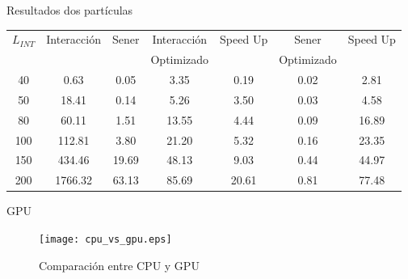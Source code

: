 \documentclass{beamer}
\begin{document}
\begin{frame}{Resultados dos part\'iculas}{}
  \begin{table}[H]
  \begin{center}

  \begin{adjustbox}{max width=\textwidth}
  \begin{tabular}{ |c|c|c|c|c|c|c| }
    \hline
    $L_{INT}$ & Interacci\'on  & Sener    & Interacci\'on & Speed Up & Sener      & Speed Up \\
              &                &          & Optimizado    &          & Optimizado & \\
    \hline
    40  & 0.63    & 0.05    & 3.35    & 0.19  & 0.02  & 2.81 \\
    50  & 18.41   & 0.14    & 5.26    & 3.50  & 0.03  & 4.58 \\
    80  & 60.11   & 1.51    & 13.55   & 4.44  & 0.09  & 16.89 \\
    100 & 112.81  & 3.80    & 21.20   & 5.32  & 0.16  & 23.35 \\
    150 & 434.46  & 19.69   & 48.13   & 9.03  & 0.44  & 44.97 \\
    200 & 1766.32 & 63.13   & 85.69   & 20.61 & 0.81  & 77.48 \\
    \hline
  \end{tabular}
  \end{adjustbox}

  \end{center}
  \end{table}
\end{frame}

\begin{frame}{GPU}{}
  \begin{figure}[h]
    \renewcommand\figurename{Gr\'agico}
    \begin{center}
      \leavevmode
   
      \texttt{[image: cpu\_vs\_gpu.eps]}

      \caption{Comparaci\'on entre CPU y GPU}

      \label{graph:cpu_vs_gpu}
    \end{center}
  \end{figure}
\end{frame}
\end{document}
